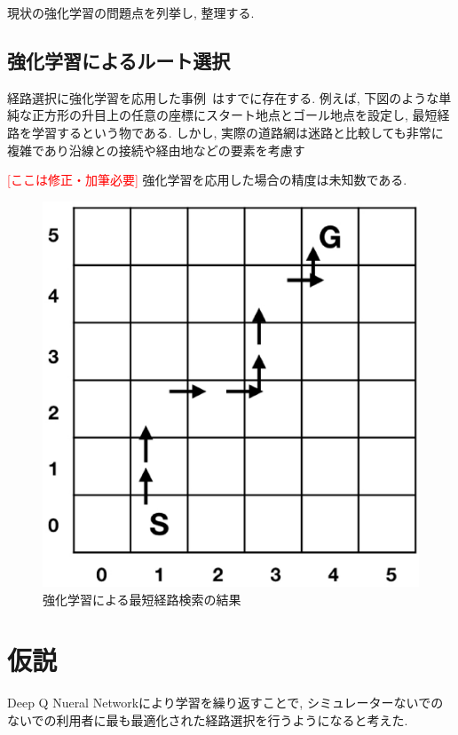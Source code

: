 現状の強化学習の問題点を列挙し, 整理する.

\subsection{強化学習によるルート選択}

経路選択に強化学習を応用した事例~\cite{DQNRouteSimple}はすでに存在する. 例えば, 下図のような単純な正方形の升目上の任意の座標にスタート地点とゴール地点を設定し, 最短経路を学習するという物である. 
しかし, 実際の道路網は迷路と比較しても非常に複雑であり沿線との接続や経由地などの要素を考慮す

\textcolor{red}{[ここは修正・加筆必要]}
強化学習を応用した場合の精度は未知数である.

\begin{figure}[H]
    \centering  %
    \includegraphics[clip,width = 13.0cm]{assets/rein_simple.eps}
    \caption{強化学習による最短経路検索の結果}  \label{sample}
\end{figure}
  





\section{仮説}

Deep Q Nueral Networkにより学習を繰り返すことで, シミュレーターないでのないでの利用者に最も最適化された経路選択を行うようになると考えた.



